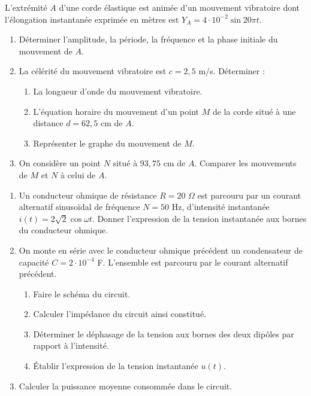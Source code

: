 \documentclass[11pt]{article}
\begin{document}
L'extrémité $A$ d'une corde élastique est animée d'un mouvement vibratoire dont l'élongation instantanée exprimée en mètres est $Y_A = 4\cdot10^{-2}\sin 20\pi t$.

\begin{enumerate}
  \item Déterminer l'amplitude, la période, la fréquence et la phase initiale du mouvement de $A$.
  \item La célérité du mouvement vibratoire est $c = 2{,}5$ m/s. Déterminer :
  \begin{enumerate}[label=\alph*.]
    \item La longueur d'onde du mouvement vibratoire.
    \item L'équation horaire du mouvement d'un point $M$ de la corde situé à une distance $d = 62{,}5$ cm de $A$.
    \item Représenter le graphe du mouvement de $M$.
  \end{enumerate}
  \item On considère un point $N$ situé à $93{,}75$ cm de $A$. Comparer les mouvements de $M$ et $N$ à celui de $A$.
\end{enumerate}

\begin{enumerate}
  \item Un conducteur ohmique de résistance $R = 20$ $\Omega$ est parcouru par un courant alternatif sinusoïdal de fréquence $N = 50$ Hz, d'intensité instantanée $i(t) = 2\sqrt{2}\cos\omega t$. Donner l'expression de la tension instantanée aux bornes du conducteur ohmique.
  \item On monte en série avec le conducteur ohmique précédent un condensateur de capacité $C = 2\cdot10^{-4}$ F. L'ensemble est parcouru par le courant alternatif précédent.
  \begin{enumerate}[label=\alph*.]
    \item Faire le schéma du circuit.
    \item Calculer l'impédance du circuit ainsi constitué.
    \item Déterminer le déphasage de la tension aux bornes des deux dipôles par rapport à l'intensité.
    \item Établir l'expression de la tension instantanée $u(t)$.
  \end{enumerate}
  \item Calculer la puissance moyenne consommée dans le circuit.
\end{enumerate}
\end{document}
